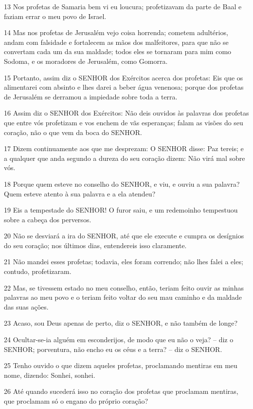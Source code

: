 \par 13 Nos profetas de Samaria bem vi eu loucura; profetizavam da parte de Baal e faziam errar o meu povo de Israel.
\par 14 Mas nos profetas de Jerusalém vejo coisa horrenda; cometem adultérios, andam com falsidade e fortalecem as mãos dos malfeitores, para que não se convertam cada um da sua maldade; todos eles se tornaram para mim como Sodoma, e os moradores de Jerusalém, como Gomorra.
\par 15 Portanto, assim diz o SENHOR dos Exércitos acerca dos profetas: Eis que os alimentarei com absinto e lhes darei a beber água venenosa; porque dos profetas de Jerusalém se derramou a impiedade sobre toda a terra.
\par 16 Assim diz o SENHOR dos Exércitos: Não deis ouvidos às palavras dos profetas que entre vós profetizam e vos enchem de vãs esperanças; falam as visões do seu coração, não o que vem da boca do SENHOR.
\par 17 Dizem continuamente aos que me desprezam: O SENHOR disse: Paz tereis; e a qualquer que anda segundo a dureza do seu coração dizem: Não virá mal sobre vós.
\par 18 Porque quem esteve no conselho do SENHOR, e viu, e ouviu a sua palavra? Quem esteve atento à sua palavra e a ela atendeu?
\par 19 Eis a tempestade do SENHOR! O furor saiu, e um redemoinho tempestuou sobre a cabeça dos perversos.
\par 20 Não se desviará a ira do SENHOR, até que ele execute e cumpra os desígnios do seu coração; nos últimos dias, entendereis isso claramente.
\par 21 Não mandei esses profetas; todavia, eles foram correndo; não lhes falei a eles; contudo, profetizaram.
\par 22 Mas, se tivessem estado no meu conselho, então, teriam feito ouvir as minhas palavras ao meu povo e o teriam feito voltar do seu mau caminho e da maldade das suas ações.
\par 23 Acaso, sou Deus apenas de perto, diz o SENHOR, e não também de longe?
\par 24 Ocultar-se-ia alguém em esconderijos, de modo que eu não o veja? -- diz o SENHOR; porventura, não encho eu os céus e a terra? -- diz o SENHOR.
\par 25 Tenho ouvido o que dizem aqueles profetas, proclamando mentiras em meu nome, dizendo: Sonhei, sonhei.
\par 26 Até quando sucederá isso no coração dos profetas que proclamam mentiras, que proclamam só o engano do próprio coração?
